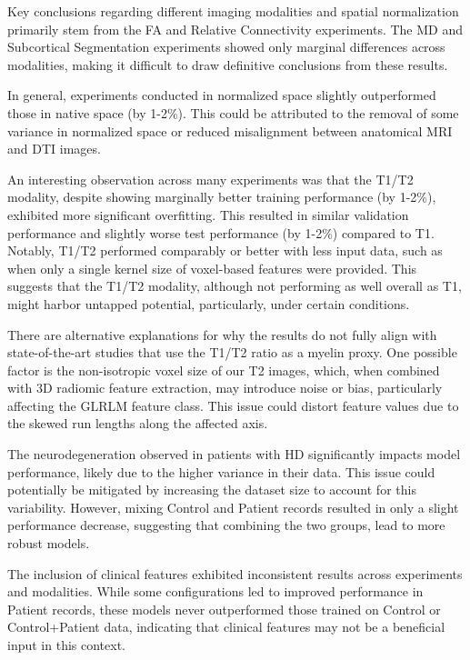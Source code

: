 Key conclusions regarding different imaging modalities and spatial normalization primarily stem from the \ac{FA} and Relative Connectivity experiments. The \ac{MD} and Subcortical Segmentation experiments showed only marginal differences across modalities, making it difficult to draw definitive conclusions from these results.\par
In general, experiments conducted in normalized space slightly outperformed those in native space (by 1-2\%). This could be attributed to the removal of some variance in normalized space or reduced misalignment between anatomical \ac{MRI} and \ac{DTI} images.\par
An interesting observation across many experiments was that the T1/T2 modality, despite showing marginally better training performance (by 1-2\%), exhibited more significant overfitting. This resulted in similar validation performance and slightly worse test performance (by 1-2\%) compared to T1. Notably, T1/T2 performed comparably or better with less input data, such as when only a single kernel size of voxel-based features were provided. This suggests that the T1/T2 modality, although not performing as well overall as T1, might harbor untapped potential, particularly, under certain conditions.\par
There are alternative explanations for why the results do not fully align with state-of-the-art studies that use the T1/T2 ratio as a myelin proxy. One possible factor is the non-isotropic voxel size of our T2 images, which, when combined with 3D radiomic feature extraction, may introduce noise or bias, particularly affecting the \ac{GLRLM} feature class. This issue could distort feature values due to the skewed run lengths along the affected axis.\par
The neurodegeneration observed in patients with \ac{HD} significantly impacts model performance, likely due to the higher variance in their data. This issue could potentially be mitigated by increasing the dataset size to account for this variability. However, mixing Control and Patient records resulted in only a slight performance decrease, suggesting that combining the two groups, lead to more robust models.\par
The inclusion of clinical features exhibited inconsistent results across experiments and modalities. While some configurations led to improved performance in Patient records, these models never outperformed those trained on Control or Control+Patient data, indicating that clinical features may not be a beneficial input in this context.\par
